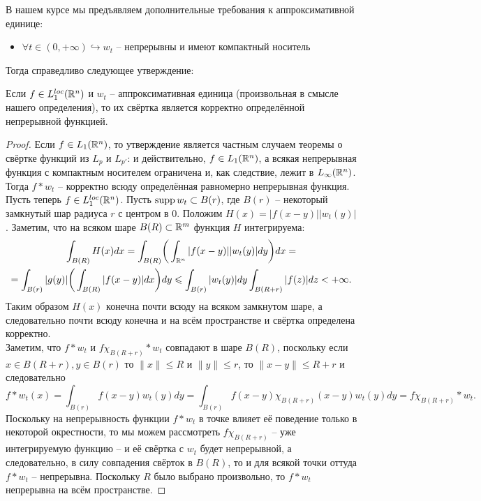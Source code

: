 \begin{note}
	В нашем курсе мы предъявляем дополнительные требования к аппроксимативной единице:
	\begin{itemize}
		\item $\forall t \in (0, +\infty) \hookrightarrow w_t$ -- непрерывны и имеют компактный носитель
	\end{itemize}
	Тогда справедливо следующее утверждение:
	\begin{theorem}
		Если $f \in L_1^{loc}(\mathbb{R}^n)$ и $w_t$ -- аппроксимативная единица (произвольная в смысле нашего определения), то их свёртка является корректно определённой непрерывной функцией.
	\end{theorem}
	\begin{proof}
		Если $f \in L_1(\mathbb{R}^n)$, то утверждение является частным случаем теоремы о свёртке функций из $L_p$ и $L_{p'}$: и действительно, $f \in L_1(\mathbb{R}^n)$, а всякая непрерывная функция с компактным носителем ограничена и, как следствие, лежит в $L_{\infty}(\mathbb{R}^n)$.
		Тогда $f * w_t$ -- корректно всюду определённая равномерно непрерывная функция. \\
		Пусть теперь $f \in L_1^{loc}(\mathbb{R}^n)$.
		Пусть $\operatorname{supp} w_t \subset B(r)$, где $B(r)$ -- некоторый замкнутый шар радиуса $r$ с центром в 0.
		Положим $H(x) = |f(x - y)||w_t(y)|$.
		Заметим, что на всяком шаре $B(R) \subset \mathbb{R}^{m}$ функция $H$ интегрируема:
		\begin{multline*}
			\int_{B(R)} H(x)dx = \int_{B(R)} \biggr(\int_{\mathbb{R}^n}|f(x - y)||w_t(y)|dy\biggr)dx = \\ = \int_{B(r)} |g(y)| \biggr(\int_{B(R)} |f(x - y)|dx \biggr) dy \leqslant \int_{B(r)} |w_t(y)|dy \int_{B(R + r)} |f(z)|dz < +\infty.
		\end{multline*}
		Таким образом $H(x)$ конечна почти всюду на всяком замкнутом шаре, а следовательно почти всюду конечна и на всём пространстве и свёртка определена корректно. \\
		Заметим, что $f * w_t$ и $f\chi_{B(R + r)} * w_t$ совпадают в шаре $B(R)$, поскольку если $x \in B(R + r), y \in B(r)$ то $\|x\| \leq R$ и $\|y\| \leq r$, то $\|x - y\| \leq R + r$ и следовательно
		\[
		f * w_t(x) = \int_{B(r)} f(x - y)w_t(y)dy = \int_{B(r)} f(x - y)\chi_{B(R + r)}(x - y)w_t(y)dy = f\chi_{B(R + r)} * w_t.
		\]
		Поскольку на непрерывность функции $f * w_t$ в точке влияет её поведение только в некоторой окрестности, то мы можем рассмотреть $f\chi_{B(R + r)}$ -- уже интегрируемую функцию -- и её свёртка с $w_t$ будет непрерывной, а следовательно, в силу совпадения свёрток в $B(R)$, то и для всякой точки оттуда $f * w_t$ -- непрерывна.
		Поскольку $R$ было выбрано произвольно, то $f * w_t$ непрерывна на всём пространстве.
	\end{proof}
\end{note}

